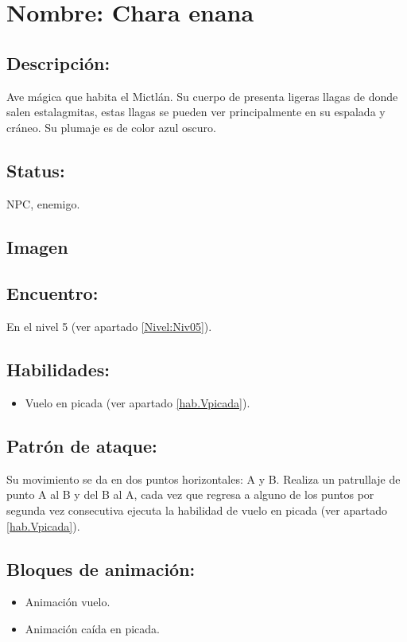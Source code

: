 \section{Nombre: Chara enana}   \label{per:chara}
\subsection{Descripción:}
Ave mágica que habita el Mictlán. Su cuerpo de presenta ligeras llagas de donde salen estalagmitas, estas llagas se pueden ver principalmente en su espalada y cráneo. Su plumaje es de color azul oscuro. 
\subsection{Status:}
NPC, enemigo.
\subsection{Imagen}

\subsection{Encuentro:}
En el nivel 5 (ver apartado \ref{Nivel:Niv05}).
\subsection{Habilidades:}
\begin{itemize}
	\item Vuelo en picada (ver apartado \ref{hab.Vpicada}).
\end{itemize}
\subsection{Patrón de ataque:}
Su movimiento se da en dos puntos horizontales: A y B. Realiza un patrullaje de punto A al B y del B al A, cada vez que regresa a alguno de los puntos por segunda vez consecutiva ejecuta la habilidad de vuelo en picada (ver apartado \ref{hab.Vpicada}).
\subsection{Bloques de animación:}
	\begin{itemize}
		\item Animación vuelo.
		\item Animación caída en picada.
	\end{itemize}